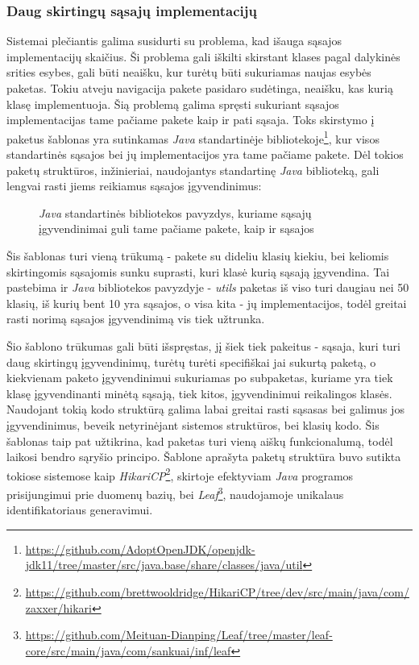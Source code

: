 \subsubsection{Daug skirtingų sąsajų implementacijų}
Sistemai plečiantis galima susidurti su problema, kad išauga sąsajos implementacijų skaičius. Ši problema gali iškilti
 skirstant klases pagal dalykinės srities esybes, gali būti neaišku, kur turėtų
būti sukuriamas naujas esybės paketas.
Tokiu atveju navigacija pakete pasidaro sudėtinga, neaišku, kas kurią klasę implementuoja.
Šią problemą galima spręsti sukuriant sąsajos implementacijas tame pačiame pakete kaip ir pati sąsaja.
Toks skirstymo į paketus šablonas yra sutinkamas \textit{Java} standartinėje bibliotekoje\footnote{\url{https://github.com/AdoptOpenJDK/openjdk-jdk11/tree/master/src/java.base/share/classes/java/util}},
kur visos standartinės sąsajos bei jų implementacijos yra tame pačiame pakete.
Dėl tokios paketų struktūros, inžinieriai, naudojantys standartinę \textit{Java} biblioteką, gali lengvai rasti jiems reikiamus sąsajos įgyvendinimus:
\begin{figure}[H]
    \snugshade
    \endsnugshade
    \caption{\textit{Java} standartinės bibliotekos pavyzdys, kuriame sąsajų įgyvendinimai guli tame pačiame pakete, kaip ir sąsajos}
\end{figure}
Šis šablonas turi vieną trūkumą - pakete su dideliu klasių kiekiu, bei keliomis skirtingomis sąsajomis sunku suprasti, kuri klasė kurią sąsają įgyvendina.
Tai pastebima ir \textit{Java} bibliotekos pavyzdyje - \textit{utils} paketas iš viso turi daugiau nei 50 klasių, iš kurių bent 10 yra sąsajos, o visa kita - jų implementacijos,
todėl greitai rasti norimą sąsajos įgyvendinimą vis tiek užtrunka.

Šio šablono trūkumas gali būti išspręstas, jį šiek tiek pakeitus - sąsaja, kuri turi daug skirtingų įgyvendinimų, turėtų turėti specifiškai jai sukurtą paketą, o kiekvienam paketo
įgyvendinimui sukuriamas po subpaketas, kuriame yra tiek klasę įgyvendinanti minėtą sąsają, tiek kitos, įgyvendinimui reikalingos klasės.
Naudojant tokią kodo struktūrą galima labai greitai rasti sąsasas bei galimus jos įgyvendinimus, beveik netyrinėjant sistemos struktūros, bei klasių kodo.
Šis šablonas taip pat užtikrina, kad paketas turi vieną aiškų funkcionalumą, todėl laikosi bendro sąryšio principo.
Šablone aprašyta paketų struktūra buvo sutikta tokiose sistemose kaip \textit{HikariCP}\footnote{\url{https://github.com/brettwooldridge/HikariCP/tree/dev/src/main/java/com/zaxxer/hikari}},
skirtoje efektyviam \textit{Java} programos prisijungimui prie duomenų bazių, bei
\textit{Leaf}\footnote{\url{https://github.com/Meituan-Dianping/Leaf/tree/master/leaf-core/src/main/java/com/sankuai/inf/leaf}}, naudojamoje unikalaus identifikatoriaus generavimui.

